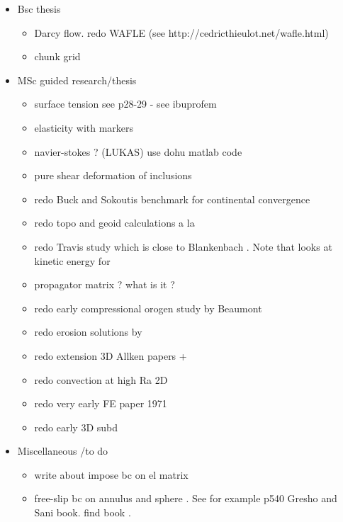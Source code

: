 
\begin{itemize}
\item Bsc thesis
\begin{itemize} 
\item Darcy flow. redo WAFLE (see http://cedricthieulot.net/wafle.html)
\item chunk grid
\end{itemize}
\item MSc guided research/thesis
\begin{itemize} 
\item surface tension see \cite{reddybook2}p28-29 - see ibuprofem 
\item elasticity with markers
\item navier-stokes ? (LUKAS) use dohu matlab code
\item pure shear deformation of inclusions \cite{trla00}
\item redo Buck and Sokoutis benchmark for continental convergence \cite{buso94}
\item redo topo and geoid calculations a la \cite{king09}
\item redo Travis study \cite{trab90} which is close to Blankenbach \cite{blbc89}. Note that \cite{maie12} looks at kinetic energy for \cite{trab90} 
\item propagator matrix ? what is it ? \cite{ribe18} \mscthesis {}  
\Literature \cite{haoc78,haoc81,riha84,zhon96,como97,mohc98,zhzu00,lezh08,leha08,mofm07,mibb09,fope91,lizh13,bugo94} 
\item redo early compressional orogen study by Beaumont \cite{bequ94}
\item redo erosion solutions by \cite{cull60} \mscthesis {} 
\item redo extension 3D Allken papers + \cite{poay84,katl95} 
\item redo convection at high Ra 2D \cite{scan85}
\item redo very early FE paper 1971 \cite{stbe71}
\item redo early 3D subd \cite{zhgu96}
\end{itemize}
\item Miscellaneous /to do
\begin{itemize} 
\item write about impose bc on el matrix
\item free-slip bc on annulus and sphere . See for example p540 Gresho and Sani book. find book \cite{deab72}.

\end{itemize}
\end{itemize}
